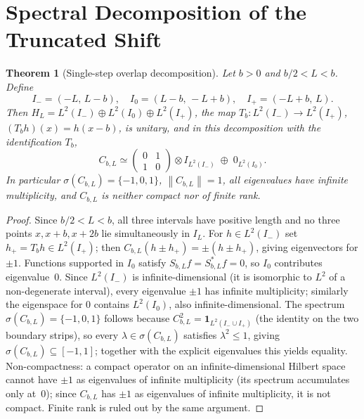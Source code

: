 \documentclass[12pt,a4paper]{amsart}
\theoremstyle{plain}
\newtheorem{theorem}{Theorem}[section]
\theoremstyle{definition}
\newcommand{\CbL}{C_{b,L}}
\newcommand{\Iminus}{I_-}
\newcommand{\Izero}{I_0}
\newcommand{\Iplus}{I_+}
\newcommand{\norm}[1]{\left\|#1\right\|}
\begin{document}
\section{Spectral Decomposition of the Truncated Shift}
\label{sec:overlap}

\begin{theorem}[Single-step overlap decomposition]
\label{thm:overlap}
Let $b > 0$ and $b/2 < L < b$.
Define
\[
  \Iminus = (-L,\, L-b),\quad
  \Izero  = (L-b,\, -L+b),\quad
  \Iplus  = (-L+b,\, L).
\]
Then $H_L = L^2(\Iminus) \oplus L^2(\Izero) \oplus L^2(\Iplus)$,
the map $T_b\colon L^2(\Iminus) \to L^2(\Iplus)$, $(T_bh)(x) = h(x-b)$,
is unitary, and in this decomposition with the identification $T_b$,
\[
  \CbL \simeq
  \begin{pmatrix} 0 & 1 \\ 1 & 0 \end{pmatrix}
  \otimes I_{L^2(\Iminus)}
  \;\oplus\; 0_{L^2(\Izero)}.
\]
In particular $\sigma(\CbL) = \{-1,0,1\}$, $\norm{\CbL} = 1$,
all eigenvalues have infinite multiplicity, and $\CbL$ is neither compact
nor of finite rank.
\end{theorem}

\begin{proof}
Since $b/2 < L < b$, all three intervals have positive length and no three
points $x, x+b, x+2b$ lie simultaneously in $I_L$.
For $h \in L^2(\Iminus)$ set $h_+ = T_bh \in L^2(\Iplus)$; then
$\CbL(h \pm h_+) = \pm(h \pm h_+)$, giving eigenvectors for $\pm 1$.
Functions supported in $\Izero$ satisfy $S_{b,L}f = S_{b,L}^*f = 0$,
so $\Izero$ contributes eigenvalue~$0$.
Since $L^2(\Iminus)$ is infinite-dimensional (it is isomorphic to $L^2$ of a
non-degenerate interval), every eigenvalue $\pm 1$ has infinite multiplicity;
similarly the eigenspace for $0$ contains $L^2(\Izero)$, also infinite-dimensional.
The spectrum $\sigma(\CbL) = \{-1,0,1\}$ follows because $\CbL^2 =
\mathbf{1}_{L^2(\Iminus\cup\Iplus)}$ (the identity on the two boundary strips),
so every $\lambda\in\sigma(\CbL)$ satisfies $\lambda^2\le 1$, giving
$\sigma(\CbL)\subseteq[-1,1]$; together with the explicit eigenvalues this yields
equality.
Non-compactness: a compact operator on an infinite-dimensional Hilbert space
cannot have $\pm 1$ as eigenvalues of infinite multiplicity (its spectrum
accumulates only at~$0$); since $\CbL$ has $\pm 1$ as eigenvalues of infinite
multiplicity, it is not compact.
Finite rank is ruled out by the same argument.
\end{proof}
\end{document}
